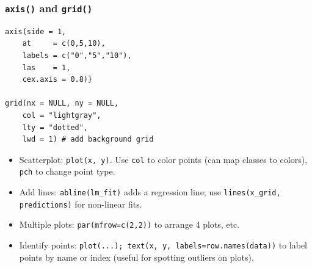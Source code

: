 \documentclass[11pt]{article}
\begin{document}
\begin{itemize}
\subsubsection*{\texttt{axis()} and \texttt{grid()}}
\begin{lstlisting}
axis(side = 1,
    at     = c(0,5,10),
    labels = c("0","5","10"),
    las    = 1,
    cex.axis = 0.8)}

grid(nx = NULL, ny = NULL,
    col = "lightgray",
    lty = "dotted",
    lwd = 1) # add background grid
\end{lstlisting}

    \begin{itemize}
        \item Scatterplot: \verb|plot(x, y)|. Use \verb|col| to color points (can map classes to colors), \verb|pch| to change point type.
        \item Add lines: \verb|abline(lm_fit)| adds a regression line; use \verb|lines(x_grid, predictions)| for non-linear fits.
        \item Multiple plots: \verb|par(mfrow=c(2,2))| to arrange 4 plots, etc.
        \item Identify points: \verb|plot(...); text(x, y, labels=row.names(data))| to label points by name or index (useful for spotting outliers on plots).
    \end{itemize}
\end{itemize}
\end{document}
